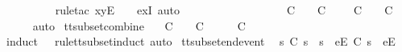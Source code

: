 \ \ \ \ \ \ \ \ \isamarkupfalse%
\ {\isacharparenleft}rule{\isacharunderscore}tac\ x{\isacharequal}{\isachardoublequoteopen}{\isacharbrackleft}y{\isacharbrackright}\isactrlsub E\ {\isacharhash}\ {\isasymrho}{\isacharprime}{\isachardoublequoteclose}\ \ exI{\isacharcomma}\ auto{\isacharparenright}\isanewline
\ \ \ \ \isamarkupfalse%
\isanewline
\ \ \isamarkupfalse%
\ \ \ \ \isanewline
\ \ \isamarkupfalse%
\ \isamarkupfalse%
\ {\isachardoublequoteopen}{\isasymsigma}{\isacharprime}\ {\isasymle}\isactrlsub C\ {\isasymsigma}\ {\isasymLongrightarrow}\ {\isasymrho}\ {\isasymsubseteq}\isactrlsub C\ {\isasymsigma}\ {\isasymLongrightarrow}\ {\isasymexists}{\isasymrho}{\isacharprime}{\isachardot}\ {\isasymrho}{\isacharprime}\ {\isasymsubseteq}\isactrlsub C\ {\isasymsigma}{\isacharprime}\ {\isasymand}\ {\isasymrho}{\isacharprime}\ {\isasymle}\isactrlsub C\ {\isasymrho}{\isachardoublequoteclose}\isanewline
\ \ \ \ \isamarkupfalse%
\ auto\isanewline
{}\isamarkupfalse%
%
\endisatagproof
{\isafoldproof}%
%
\isadelimproof
\isanewline
%
\endisadelimproof
\isanewline
{}\isamarkupfalse%
\ tt{\isacharunderscore}subset{\isacharunderscore}combine{\isacharcolon}\isanewline
\ \ {\isachardoublequoteopen}{\isasymrho}{\isacharprime}\ {\isasymsubseteq}\isactrlsub C\ {\isasymrho}\ {\isasymLongrightarrow}\ {\isasymsigma}{\isacharprime}\ {\isasymsubseteq}\isactrlsub C\ {\isasymsigma}\ {\isasymLongrightarrow}\ {\isasymrho}{\isacharprime}\ {\isacharat}\ {\isasymsigma}{\isacharprime}\ {\isasymsubseteq}\isactrlsub C\ {\isasymrho}\ {\isacharat}\ {\isasymsigma}{\isachardoublequoteclose}\isanewline
%
\isadelimproof
\ \ %
\endisadelimproof
%
\isatagproof
{}\isamarkupfalse%
\ {\isacharparenleft}induct\ {\isasymrho}{\isacharprime}\ {\isasymrho}\ rule{\isacharcolon}tt{\isacharunderscore}subset{\isachardot}induct{\isacharcomma}\ auto{\isacharparenright}%
\endisatagproof
{\isafoldproof}%
%
\isadelimproof
\isanewline
%
\endisadelimproof
\isanewline
{}\isamarkupfalse%
\ tt{\isacharunderscore}subset{\isacharunderscore}end{\isacharunderscore}event{\isacharcolon}\isanewline
\ \ {\isachardoublequoteopen}s{\isacharprime}\ {\isasymsubseteq}\isactrlsub C\ s\ {\isasymLongrightarrow}\ s{\isacharprime}\ {\isacharat}\ {\isacharbrackleft}{\isacharbrackleft}e{\isacharbrackright}\isactrlsub E{\isacharbrackright}\ {\isasymsubseteq}\isactrlsub C\ s\ {\isacharat}\ {\isacharbrackleft}{\isacharbrackleft}e{\isacharbrackright}\isactrlsub E{\isacharbrackright}{\isachardoublequoteclose}\isanewline
